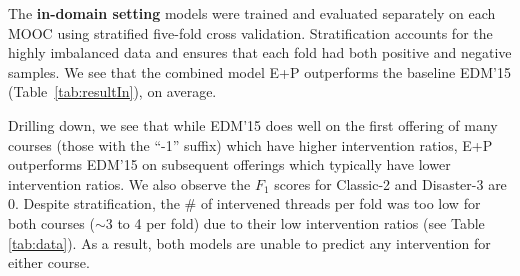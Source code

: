 \documentclass[letterpaper]{article}
\begin{document}
The \textbf{in-domain setting} models were trained and evaluated separately on 
each MOOC using stratified five-fold cross validation. Stratification accounts 
for the highly imbalanced data and ensures that each fold had both positive and
negative samples.
We see that the combined model E+P outperforms the baseline EDM'15 
(Table~\ref{tab:resultIn}), on average. 

Drilling down, we see that while EDM'15 does well on the first 
offering 
of many courses (those with the ``-1'' suffix)
which have higher intervention ratios, E+P outperforms EDM'15 on subsequent 
offerings which typically have lower intervention ratios.
We also observe the $F_1$ scores for {\sc Classic-2} and {\sc Disaster-3} are 0.
Despite stratification, the \# of intervened threads per fold was 
too low for both courses ($\sim$3 to 4 per fold) due to their low intervention 
ratios (see Table \ref{tab:data}). As a result, both models are unable to 
predict any intervention for either course.
\end{document}
